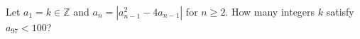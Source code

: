 Let $a_1=k\in\mathbb Z$ and $a_n=|a_{n-1}^2-4a_{n-1}|$ for $n\ge2$. How many integers $k$ satisfy $a_{97}<100$?

